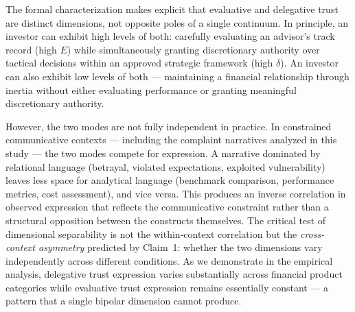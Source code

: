 The formal characterization makes explicit that evaluative and delegative trust are distinct dimensions, not opposite poles of a single continuum. In principle, an investor can exhibit high levels of both: carefully evaluating an advisor's track record (high $E$) while simultaneously granting discretionary authority over tactical decisions within an approved strategic framework (high $\delta$). An investor can also exhibit low levels of both --- maintaining a financial relationship through inertia without either evaluating performance or granting meaningful discretionary authority.

However, the two modes are not fully independent in practice. In constrained communicative contexts --- including the complaint narratives analyzed in this study --- the two modes compete for expression. A narrative dominated by relational language (betrayal, violated expectations, exploited vulnerability) leaves less space for analytical language (benchmark comparison, performance metrics, cost assessment), and vice versa. This produces an inverse correlation in observed expression that reflects the communicative constraint rather than a structural opposition between the constructs themselves. The critical test of dimensional separability is not the within-context correlation but the \textit{cross-context asymmetry} predicted by Claim~1: whether the two dimensions vary independently across different conditions. As we demonstrate in the empirical analysis, delegative trust expression varies substantially across financial product categories while evaluative trust expression remains essentially constant --- a pattern that a single bipolar dimension cannot produce.

